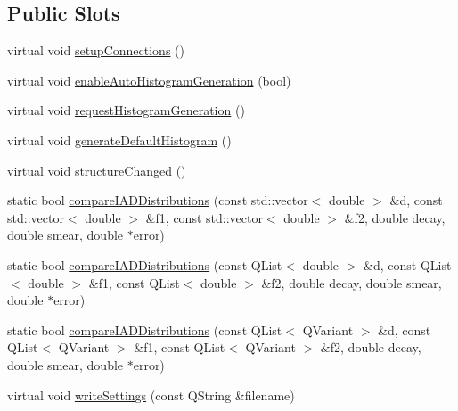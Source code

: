 \subsection*{Public Slots}
\begin{DoxyCompactItemize}
\item 
virtual void \hyperlink{classGlobalSearch_1_1Structure_aff5394b9be0fa599c58f906d9a03f9d5}{setup\+Connections} ()
\item 
virtual void \hyperlink{classGlobalSearch_1_1Structure_a36f95cfbd571cce162a4bc59bb468f61}{enable\+Auto\+Histogram\+Generation} (bool)
\item 
virtual void \hyperlink{classGlobalSearch_1_1Structure_aaed562bf0ad4fe7bec1567eb84dbeee2}{request\+Histogram\+Generation} ()
\item 
virtual void \hyperlink{classGlobalSearch_1_1Structure_a57ae57cebf3df177a1363b91383a1c69}{generate\+Default\+Histogram} ()
\item 
virtual void \hyperlink{classGlobalSearch_1_1Structure_a1e30a18add5bd7e217546333262010ad}{structure\+Changed} ()
\item 
static bool \hyperlink{classGlobalSearch_1_1Structure_a92cca2b7d5a566d69dd228d267758c73}{compare\+I\+A\+D\+Distributions} (const std\+::vector$<$ double $>$ \&d, const std\+::vector$<$ double $>$ \&f1, const std\+::vector$<$ double $>$ \&f2, double decay, double smear, double $\ast$error)
\item 
static bool \hyperlink{classGlobalSearch_1_1Structure_a70f9ced5a098560bad9fe97d1bb6361a}{compare\+I\+A\+D\+Distributions} (const Q\+List$<$ double $>$ \&d, const Q\+List$<$ double $>$ \&f1, const Q\+List$<$ double $>$ \&f2, double decay, double smear, double $\ast$error)
\item 
static bool \hyperlink{classGlobalSearch_1_1Structure_aaed919f70884814f824aac01d619f004}{compare\+I\+A\+D\+Distributions} (const Q\+List$<$ Q\+Variant $>$ \&d, const Q\+List$<$ Q\+Variant $>$ \&f1, const Q\+List$<$ Q\+Variant $>$ \&f2, double decay, double smear, double $\ast$error)
\item 
virtual void \hyperlink{classGlobalSearch_1_1Structure_af6da83169c21363c545ef3ee01d891d3}{write\+Settings} (const Q\+String \&filename)
\end{DoxyCompactItemize}
